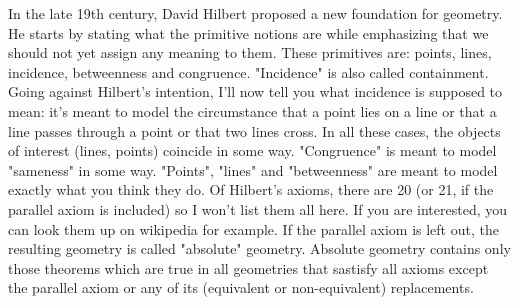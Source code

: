 \medskip
In the late 19th century, David Hilbert proposed a new foundation for geometry. He starts by stating what the primitive notions are while emphasizing that we should not yet assign any meaning to them. These primitives are: points, lines, incidence, betweenness and congruence. "Incidence" is also called containment. Going against Hilbert's intention, I'll now tell you what incidence is supposed to mean: it's meant to model the circumstance that a point lies on a line or that a line passes through a point or that two lines cross. In all these cases, the objects of interest (lines, points) coincide in some way. "Congruence" is meant to model "sameness" in some way. "Points", "lines" and "betweenness" are meant to model exactly what you think they do. Of Hilbert's axioms, there are 20 (or 21, if the parallel axiom is included) so I won't list them all here. If you are interested, you can look them up on wikipedia for example. If the parallel axiom is left out, the resulting geometry is called "absolute" geometry. Absolute geometry contains only those theorems which are true in all geometries that sastisfy all axioms except the parallel axiom or any of its (equivalent or non-equivalent) replacements.

